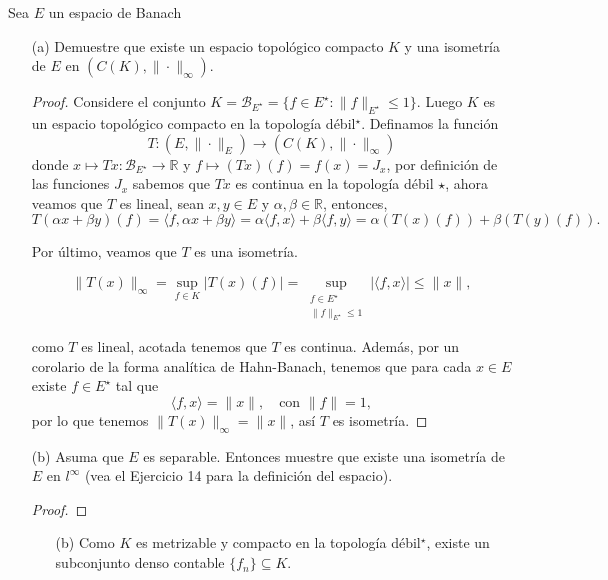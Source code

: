  Sea $E$ un espacio de Banach
 \begin{itemize}
     \item[(a)] Demuestre que existe un espacio topológico compacto $K$ y una isometría de $E$ en $\left(C(K),\|\cdot\|_{\infty}\right)$.
     \begin{proof}
         Considere el conjunto $K=\mathcal{B}_{E^{\star}}=\{f \in E^{\star}:\|f\|_{E^{\star}}\leq 1\}$. Luego $K$ es un espacio topológico compacto en la topología débil$^{\star}$. Definamos la función $$T \colon (E, \|\cdot\|_E) \to(C(K), \|\cdot\|_\infty)$$ donde $x \mapsto Tx \colon \mathcal{B}_{E^{\star}} \to \mathbb{R}$
y $f \mapsto (Tx)(f) =f(x)=J_x$, por definición de las funciones $J_x$ sabemos que $Tx$ es continua en la topología débil $\star$, ahora veamos que $T$ es lineal, sean $x, y \in E$ y $\alpha, \beta \in \mathbb{R}$, entonces,
\[
T(\alpha x + \beta y)(f) = \langle f, \alpha x + \beta y \rangle = \alpha \langle f, x \rangle + \beta \langle f, y \rangle = \alpha (T(x)(f)) + \beta (T(y)(f)).
\]

Por último, veamos que $T$ es una isometría.

\[
\|T(x)\|_\infty = \sup_{f \in K} |T(x)(f)| = \sup_{\substack{f \in E^{\star} \\ \|f\|_{E^{\star}} \leq 1}} |\langle f, x \rangle|\leq \|x\|,
\]

como $T$ es lineal, acotada tenemos que $T$ es continua. Además, por un corolario de la forma analítica de Hahn-Banach, tenemos que para cada $x \in E$ existe $f \in E^{\star}$ tal que
\[
\langle f, x \rangle = \|x\|, \quad \text{con } \|f\| = 1,
\]
por lo que tenemos $\|T(x)\|_\infty = \|x\|$, así $T$ es isometría.

     \end{proof}




     \item[(b)] Asuma que $E$ es separable. Entonces muestre que existe una isometría de $E$ en $l^{\infty}$ (vea el Ejercicio 14 para la definición del espacio).
     \begin{proof}
         
     \end{proof}


     









\begin{itemize}
    \item[(b)] Como $K$ es metrizable y compacto en la topología débil$^{\star}$, existe un subconjunto denso contable $\{f_n\} \subseteq K$.
\end{itemize}


\end{itemize}
